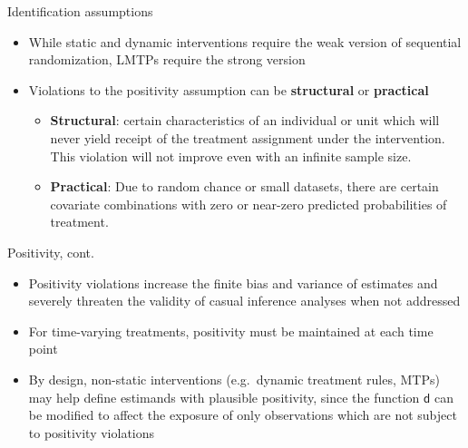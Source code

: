 \documentclass[
  10pt,
  ignorenonframetext,
]{beamer}
\begin{document}
\begin{frame}{Identification assumptions}
\protect\hypertarget{identification-assumptions-1}{}
\begin{itemize}
\item
  While static and dynamic interventions require the weak version of
  sequential randomization, LMTPs require the strong version
\item
  Violations to the positivity assumption can be \textbf{structural} or
  \textbf{practical}

  \begin{itemize}
  \item
    \textbf{Structural}: certain characteristics of an individual or
    unit which will never yield receipt of the treatment assignment
    under the intervention. This violation will not improve even with an
    infinite sample size.
  \item
    \textbf{Practical}: Due to random chance or small datasets, there
    are certain covariate combinations with zero or near-zero predicted
    probabilities of treatment.
  \end{itemize}
\end{itemize}
\end{frame}

\begin{frame}{Positivity, cont.}
\protect\hypertarget{positivity-cont.}{}
\begin{itemize}
\item
  Positivity violations increase the finite bias and variance of
  estimates and severely threaten the validity of casual inference
  analyses when not addressed
\item
  For time-varying treatments, positivity must be maintained at each
  time point
\item
  By design, non-static interventions (e.g.~dynamic treatment rules,
  MTPs) may help define estimands with plausible positivity, since the
  function \(\mathsf{d}\) can be modified to affect the exposure of only
  observations which are not subject to positivity violations
\end{itemize}
\end{frame}
\end{document}
